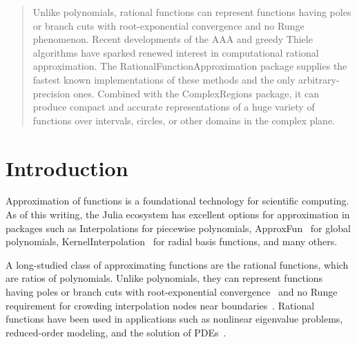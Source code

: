 \documentclass{juliacon}
\begin{document}


\maketitle

\begin{abstract}
Unlike polynomials, rational functions can represent functions having poles or branch cuts with root-exponential convergence and no Runge phenomenon. Recent developments of the AAA and greedy Thiele algorithms have sparked renewed interest in computational rational approximation. The \textsf{RationalFunctionApproximation} package supplies the fastest known implementations of these methods and the only arbitrary-precision ones. Combined with the \textsf{ComplexRegions} package, it can produce compact and accurate representations of a huge variety of functions over intervals, circles, or other domains in the complex plane.
\end{abstract}

\section{Introduction}

Approximation of functions is a foundational technology for scientific computing. As of this writing, the Julia ecosystem has excellent options for approximation in packages such as \textsf{Interpolations} \cite{kittisopikulInterpolationsjl2025} for piecewise polynomials, \textsf{ApproxFun}~\cite{olverPracticalFramework2014} for global polynomials, \textsf{KernelInterpolation}~\cite{lampertKernelInterpolationjlMultivariate2024} for radial basis functions, and many others.

A long-studied class of approximating functions are the rational functions, which are ratios of polynomials. Unlike polynomials, they can represent functions having poles or branch cuts with root-exponential convergence~\cite{newmanRationalApproximation1964, herremansResolutionSingularities2023} and no Runge requirement for crowding interpolation nodes near boundaries~\cite{platteImpossibilityFast2011}. Rational functions have been used in applications such as nonlinear eigenvalue problems, reduced-order modeling, and the solution of PDEs~\cite{antoulasInterpolatoryMethods2020,budisaRationalApproximation2022,gopalSolvingLaplace2019,hautSolvingBurgers2013,lietaertAutomaticRational2022,rodriguezPAAAAlgorithm2022,trefethenNumericalConformal2020}.
\end{document}
